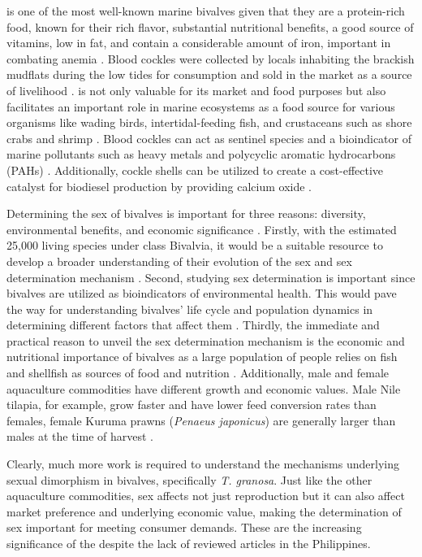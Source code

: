 {\newpage
\Tgranosa is one of the most well-known marine bivalves given that they are a protein-rich food, known for their rich flavor, substantial nutritional benefits, a good source of vitamins, low in fat, and contain a considerable amount of iron, important in combating anemia \cite{zha2022}. Blood cockles were collected by locals inhabiting the brackish mudflats during the low tides for consumption and sold in the market as a source of livelihood \cite{miranda2023}. \Tgranosa is not only valuable for its market and food purposes but also facilitates an important role in marine ecosystems as a food source for various organisms like wading birds, intertidal-feeding fish, and crustaceans such as shore crabs and shrimp \cite{burdon2014}. Blood cockles can act as sentinel species and a bioindicator of marine pollutants such as heavy metals \cite{ishak2016} and polycyclic aromatic hydrocarbons (PAHs) \cite{sany2014}. Additionally, cockle shells can be utilized to create a cost-effective catalyst for biodiesel production by providing calcium oxide \cite{boey2011waste}.

Determining the sex of bivalves is important for three reasons: diversity, environmental benefits, and economic significance \cite{breton2010novel}. Firstly, with the estimated 25,000 living species under class Bivalvia, it would be a suitable resource to develop a broader understanding of their evolution of the sex and sex determination mechanism  \cite{breton2010novel}. Second, studying sex determination is important since bivalves are utilized as bioindicators of environmental health. This would pave the way for understanding bivalves' life cycle and population dynamics in determining different factors that affect them \cite{campos2012}. Thirdly, the immediate and practical reason to unveil the sex determination mechanism is the economic and nutritional importance of bivalves as a large population of people relies on fish and shellfish as sources of food and nutrition \cite{naylor2000}. Additionally, male and female aquaculture commodities have different growth and economic values. Male Nile tilapia, for example, grow faster and have lower feed conversion rates than females, female Kuruma prawns (\textit{Penaeus japonicus}) are generally larger than males at the time of harvest \cite{budd}. 

Clearly, much more work is required to understand the mechanisms underlying sexual dimorphism in bivalves, specifically \textit{T. granosa}. Just like the other aquaculture commodities, sex affects not just reproduction but it can also affect market preference and underlying economic value, making the determination of sex important for meeting consumer demands. These are the increasing significance of the \Tgranosa despite the lack of reviewed articles in the Philippines.

}
